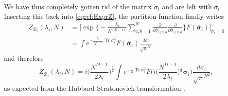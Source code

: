 \documentclass[aps,prd,10pt,notitlepage,nofootinbib,superscriptaddress,showkeys,showpacs]{revtex4-1}
\begin{document}
We have thus completely gotten rid of the matrix $\sigma_i$ and are left with $\bar{\sigma}_i$. Inserting this back into \eqref{eqref:ExprZ}, the partition function finally writes
\begin{equation}
\begin{aligned}
Z_{{\mathcal{B}}_i}(\lambda_i, N)&=\biggl[ \exp\biggl\{-\frac{\lambda_i}{ N^{(D-1)}}\sum_{a,b=1}^N \frac{\partial}{\partial\bar\sigma_{i\mid a,b}}\frac{\partial}{\partial\bar\sigma_{i\mid b,a}}   \biggr\} F(\bar{\bm{\sigma}}_i) \biggr]_{\bar\sigma_i=0}\\
&=\int e^{ +\frac{\lambda_i}{N^{D-1}}\operatorname{Tr}\bar \sigma_i^2}F(\bar{\bm{\sigma}}_i)\frac{d{\bar  \sigma_i}}{\sqrt{\pi}^{N^2}}
\end{aligned}
\end{equation}
and therefore
\begin{equation}
Z_{{\mathcal{B}}_i}(\lambda_i, N) = i\biggl(\frac{N^{D-1}}{2\lambda_i}\biggr)^{\frac{1}{2}}\int e^{ -\frac{1}{2}\operatorname{Tr} \sigma_i^2}F\biggl(i\biggl(\frac{N^{D-1}}{2\lambda_i}\biggr)^{\frac{1}{2}}{\bm{\sigma}}_i\biggr)\frac{d{\sigma_i}}{\sqrt{\pi}^{N^2}},
\end{equation}
as expected from the Hubbard-Stratonovich transformation \cite{BeyondPert}.
\end{document}
